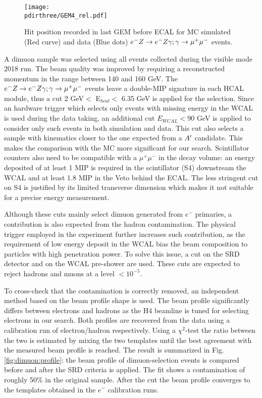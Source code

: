\begin{figure}[tbh!]
  \begin{center}
    \texttt{[image: \\pdirthree/GEM4\_rel.pdf]}
  \end{center}

  \caption[Hit position of $\emu$ in GEM MC-DATA]{Hit position recorded in last GEM before ECAL for MC simulated (Red curve) and data (Blue dots) $\emu$ events.}
  \label{fig:dimuon:gemspectra}
\end{figure}
  

A dimuon sample was selected using all events collected during the visible mode 2018 run. The beam quality was improved by requiring a reconstructed momentum in the range between 140 and 160 GeV. The $\emu$ events leave a double-MIP signature in each HCAL module, thus a cut 2 GeV$<$ E$_{hcal} <$ 6.35 GeV is applied for the selection. Since an hardware trigger which selects only events with missing energy in the WCAL is used during the data taking, an additional cut $E_{WCAL} < 90$ GeV is applied to consider only such events in both simulation and data. This cut also selects a sample with kinematics closer to the one expected from a $A'$ candidate. This makes the comparison with the MC more significant for our search. Scintillator counters also need to be compatible with a $\mu^+ \mu^-$ in the decay volume: an energy deposited of at least 1 MIP is required in the scintillator (S4) downstream the WCAL and at least 1.8 MIP in the Veto behind the ECAL. The less stringent cut on S4 is justified by its limited transverse dimension which makes it not suitable for a precise energy measurement.

Although these cuts mainly select dimuon generated from $e^-$ primaries, a contribution is also expected from the hadron contamination. The physical trigger employed in the experiment further increases such contribution, as the requirement of low energy deposit in the WCAL bias the beam composition to particles with high penetration power. To solve this issue, a cut on the SRD detector and on the WCAL pre-shower are used. These cuts are expected to reject hadrons and muons at a level $<10^{-5}$.

To cross-check that the contamination is correctly removed, an independent method based on the beam profile shape is used. The beam profile significantly differs between electrons and hadrons as the H4 beamline is tuned for selecting electrons in our search. Both profiles are recovered from the data using a calibration run of electron/hadron respectively. Using a  $\chi^2$-test the ratio between the two is estimated by mixing the two templates until the best agreement with the measured beam profile is reached. The result is summarized in Fig.\ref{fig:dimuon:profile}: the beam profile of dimuon-selection events is compared before and after the SRD criteria is applied. The fit shows a contamination of roughly 50\% in the original sample. After the cut the beam profile converges to the templates obtained in the $e^-$ calibration runs.

